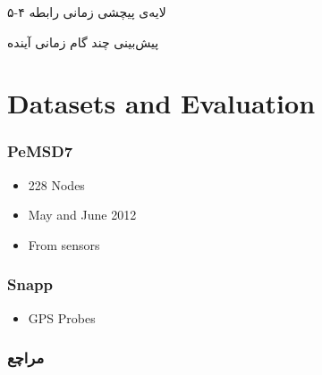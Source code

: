 \documentclass{beamer}
\begin{document}
\begin{persian}
\begin{frame}
  لایه‌ی پیچشی زمانی
  رابطه ۴-۵
\end{frame}

\begin{frame}
  پیش‌بینی چند گام زمانی آینده
\end{frame}

\section{Datasets and Evaluation}

\begin{frame}
  \frametitle{PeMSD7}
  \begin{itemize}
    \item 228 Nodes
    \item May and June 2012
    \item From sensors
  \end{itemize}
\end{frame}
\begin{frame}
  \frametitle{Snapp}
  \begin{itemize}
    \item GPS Probes
  \end{itemize}
\end{frame}

\begin{frame}[allowframebreaks]
  \frametitle{مراچع}
  \begin{latin}
  \printbibliography[title=مراجع]
  \end{latin}
\end{frame}

\end{persian}
\end{document}
